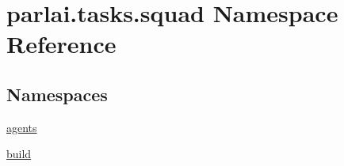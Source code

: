\hypertarget{namespaceparlai_1_1tasks_1_1squad}{}\section{parlai.\+tasks.\+squad Namespace Reference}
\label{namespaceparlai_1_1tasks_1_1squad}
\subsection*{Namespaces}
\begin{DoxyCompactItemize}
\item 
 \hyperlink{namespaceparlai_1_1tasks_1_1squad_1_1agents}{agents}
\item 
 \hyperlink{namespaceparlai_1_1tasks_1_1squad_1_1build}{build}
\end{DoxyCompactItemize}
